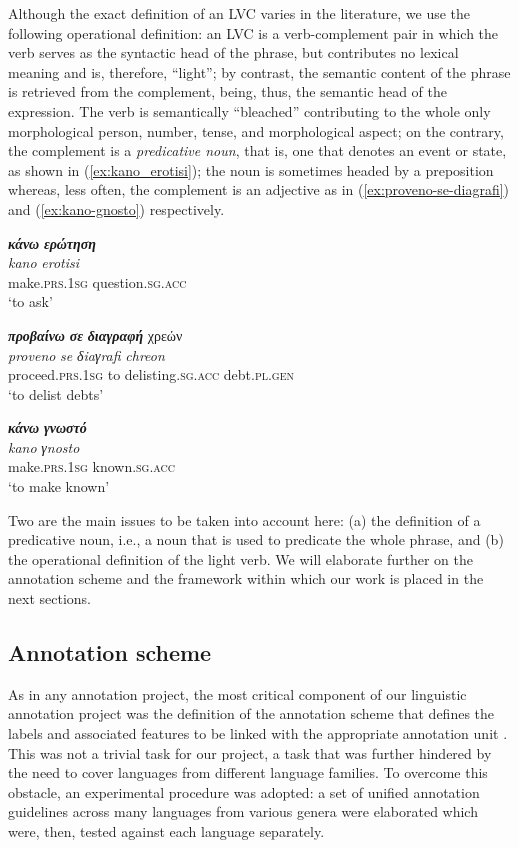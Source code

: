 \documentclass[output=paper,colorlinks,citecolor=brown]{langscibook}
\begin{document}
Although the exact definition of an LVC varies in the literature, we use the following operational definition: an LVC is a verb-complement pair in which the verb serves as the syntactic head of the phrase, but contributes no lexical meaning and is, therefore, “light”; by contrast, the semantic content of the phrase is retrieved from the complement, being, thus, the semantic head of the expression. The verb is semantically ``bleached'' contributing to the whole only morphological person, number, tense, and morphological aspect; on the contrary, the complement is a \textit{predicative noun}, that is, one that denotes an event or state, as shown in (\ref{ex:kano_erotisi}); the noun is sometimes headed by a preposition whereas, less often, the complement is an adjective as in (\ref{ex:proveno-se-diagrafi}) and (\ref{ex:kano-gnosto}) respectively.

\ea
\label{ex:kano_erotisi}
\settowidth {} 
\glll 
\textbf{\em{κάνω}}       	\textbf{\em{ερώτηση}}\\
\textit{kano}        	\textit{erotisi}\\
make.\textsc{prs.1sg}             question.\textsc{sg.acc}\\
\glt ‘to ask’
\z

\ea
\label{ex:proveno-se-diagrafi}
\settowidth {} 
\glll 
\textbf{\em{προβαίνω}} \textbf{\em{σε}}  \textbf{\em{διαγραφή}} χρεών\\
\textit{proveno} \textit{se} \textit{δiaγrafi} \textit{chreon}\\
proceed.\textsc{prs.1sg}  to delisting.\textsc{sg.acc} debt.\textsc{pl.gen}\\
\glt ‘to delist debts’
\z

\ea
\label{ex:kano-gnosto}
\settowidth {} 
\glll 
\textbf{\em{κάνω}} \textbf{\em{γνωστό}} \\
\textit{kano} \textit{γnosto}\\
make.\textsc{prs.1sg}  known.\textsc{sg.acc} \\
\glt ‘to make known’
\z

Two are the main issues to be taken into account here: (a) the definition of a predicative noun, i.e., a noun that is used to predicate the whole phrase, and (b) the operational definition of the light verb. We will elaborate further on the annotation scheme and the framework within which our work is placed in the next sections.

\subsection{Annotation scheme}
\label{sec:PARSEMEScheme}
As in any annotation project, the most critical component of our linguistic annotation project was the definition of the annotation scheme that defines the labels and associated features to be linked with the appropriate annotation unit \citep{Ide2017}. This was not a trivial task for our project, \textemdash a task that was further hindered by the need to cover languages from different language families. To overcome this obstacle, an experimental procedure was adopted: a set of unified annotation guidelines across many languages from various genera were elaborated which were, then, tested against each language separately.
\end{document}
